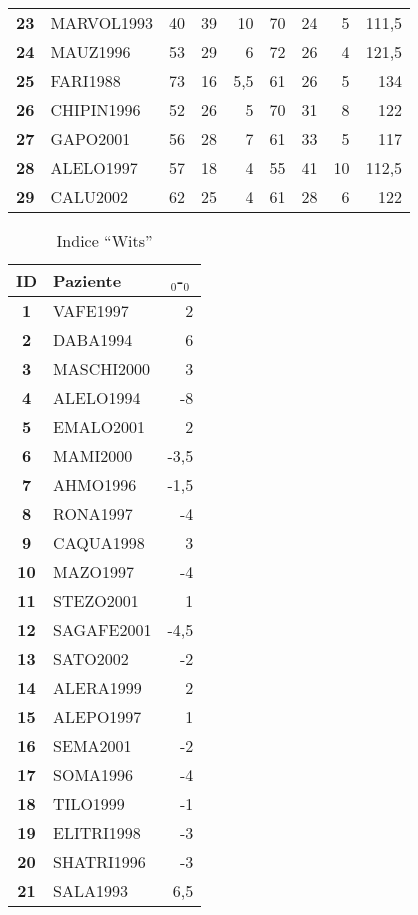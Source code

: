 \begin{landscape}
\begin{table}[p]
\begin{tabular}{>{\bfseries}cl*{3}{D{,}{,}{-1}}|*{3}{D{,}{,}{2.1}}|D{,}{,}{3.1}}
23 & MARVOL1993 & 40 & 39 & 10 & 70 & 24 & 5 & 111,5 \\
24 & MAUZ1996 & 53 & 29 & 6 & 72 & 26 & 4 & 121,5 \\
25 & FARI1988 & 73 & 16 & 5,5 & 61 & 26 & 5 & 134 \\
26 & CHIPIN1996 & 52 & 26 & 5 & 70 & 31 & 8 & 122 \\
27 & GAPO2001 & 56 & 28 & 7 & 61 & 33 & 5 & 117 \\
28 & ALELO1997 & 57 & 18 & 4 & 55 & 41 & 10 & 112,5 \\
29 & CALU2002 & 62 & 25 & 4 & 61 & 28 & 6 & 122 \\
\bottomrule
\end{tabular}
\end{table}

\begin{table}
\footnotesize
\begin{varwidth}{\columnwidth}
\centering
\caption{Indice ``Wits''}
\begin{tabular}{>{\bfseries}clD{,}{,}{-1}}
\toprule
ID & Paziente &  \\
 & VAFE1997 & 2 \\
2 & DABA1994 & 6 \\
3 & MASCHI2000 & 3 \\
4 & ALELO1994 & -8 \\
5 & EMALO2001 & 2 \\
6 & MAMI2000 & -3,5 \\
7 & AHMO1996 & -1,5 \\
8 & RONA1997 & -4 \\
9 & CAQUA1998 & 3 \\
10 & MAZO1997 & -4 \\
11 & STEZO2001 & 1 \\
12 & SAGAFE2001 & -4,5 \\
13 & SATO2002 & -2 \\
14 & ALERA1999 & 2 \\
15 & ALEPO1997 & 1 \\
16 & SEMA2001 & -2 \\
17 & SOMA1996 & -4 \\
18 & TILO1999 & -1 \\
19 & ELITRI1998 & -3 \\
20 & SHATRI1996 & -3 \\
21 & SALA1993 & 6,5 \\

\end{tabular}
\end{varwidth}
\end{table}
\end{landscape}
